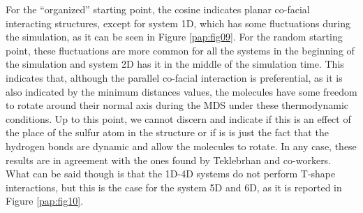 For the ``organized'' starting point, the cosine indicates planar co-facial interacting structures, except for system 1D, which has some fluctuations during the simulation, as it can be seen in Figure \ref{pap:fig09}. For the random starting point, these fluctuations are more common for all the systems in the beginning of the simulation and system 2D has it in the middle of the simulation time. This indicates that, although the parallel co-facial interaction is preferential, as it is also indicated by the minimum distances values, the molecules have some freedom to rotate around their normal axis during the MDS under these thermodynamic conditions. Up to this point, we cannot discern and indicate if this is an effect of the place of the sulfur atom in the structure or if is is just the fact that the hydrogen bonds are dynamic and allow the molecules to rotate. In any case, these results are in agreement with the ones found by Teklebrhan and co-workers.\cite{teklebrhan2012probing} What can be said though is that the 1D-4D systems do not perform T-shape interactions, but this is the case for the system 5D and 6D, as it is reported in Figure \ref{pap:fig10}.

